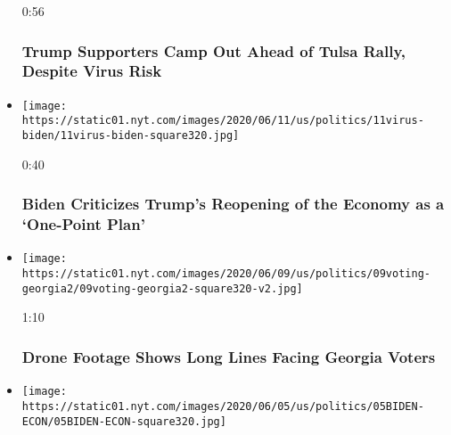 \begin{itemize}
  0:56

  \hypertarget{trump-supporters-camp-out-ahead-of-tulsa-rally-despite-virus-risk}{%
  \subsubsection{Trump Supporters Camp Out Ahead of Tulsa Rally, Despite
  Virus
  Risk}\label{trump-supporters-camp-out-ahead-of-tulsa-rally-despite-virus-risk}}
\item
  \href{https://www.nytimes.com/video/us/100000007186817/biden-criticizes-trumps-reopening-of-the-economy-as-a-one-point-plan.html?action=click\&module=video-series-bar\&region=header\&pgtype=Article\&playlistId=video/2020-Elections}{}

  \texttt{[image: https://static01.nyt.com/images/2020/06/11/us/politics/11virus-biden/11virus-biden-square320.jpg]}

  0:40

  \hypertarget{biden-criticizes-trumps-reopening-of-the-economy-as-a-one-point-plan}{%
  \subsubsection{Biden Criticizes Trump's Reopening of the Economy as a
  `One-Point
  Plan'}\label{biden-criticizes-trumps-reopening-of-the-economy-as-a-one-point-plan}}
\item
  \href{https://www.nytimes.com/video/us/100000007182268/georgia-election-day-atlanta.html?action=click\&module=video-series-bar\&region=header\&pgtype=Article\&playlistId=video/2020-Elections}{}

  \texttt{[image: https://static01.nyt.com/images/2020/06/09/us/politics/09voting-georgia2/09voting-georgia2-square320-v2.jpg]}

  1:10

  \hypertarget{drone-footage-shows-long-lines-facing-georgia-voters}{%
  \subsubsection{Drone Footage Shows Long Lines Facing Georgia
  Voters}\label{drone-footage-shows-long-lines-facing-georgia-voters}}
\item
  \href{https://www.nytimes.com/video/us/100000007177074/biden-trump-economy-george-floyd.html?action=click\&module=video-series-bar\&region=header\&pgtype=Article\&playlistId=video/2020-Elections}{}

  \texttt{[image: https://static01.nyt.com/images/2020/06/05/us/politics/05BIDEN-ECON/05BIDEN-ECON-square320.jpg]}


\end{itemize}
